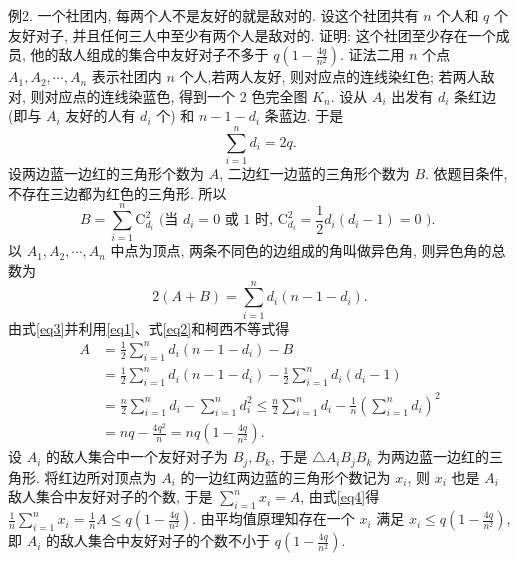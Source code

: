例2. 一个社团内, 每两个人不是友好的就是敌对的.
设这个社团共有 $n$ 个人和 $q$ 个友好对子, 并且任何三人中至少有两个人是敌对的.
证明: 这个社团至少存在一个成员, 他的敌人组成的集合中友好对子不多于 $q\left(1-\frac{4 q}{n^2}\right)$. 
证法二用 $n$ 个点 $A_1, A_2, \cdots, A_n$ 表示社团内 $n$ 个人,若两人友好, 则对应点的连线染红色; 若两人敌对, 则对应点的连线染蓝色, 得到一个 2 色完全图 $K_n$. 设从 $A_i$ 出发有 $d_i$ 条红边 (即与 $A_i$ 友好的人有 $d_i$ 个) 和 $n-1-d_i$ 条蓝边.
于是
$$
\sum_{i=1}^n d_i=2 q . \label{eq1}
$$
设两边蓝一边红的三角形个数为 $A$, 二边红一边蓝的三角形个数为 $B$. 依题目条件,不存在三边都为红色的三角形.
所以
$$
B=\sum_{i=1}^n \mathrm{C}_{d_i}^2 \text { (当 } d_i=0 \text { 或 } 1 \text { 时, } \mathrm{C}_{d_i}^2=\frac{1}{2} d_i\left(d_i-1\right)=0 \text { ). } \label{eq2}
$$
以 $A_1, A_2, \cdots, A_n$ 中点为顶点, 两条不同色的边组成的角叫做异色角, 则异色角的总数为
$$
2(A+B)=\sum_{i=1}^n d_i\left(n-1-d_i\right) . \label{eq3}
$$
由式\ref{eq3}并利用\ref{eq1}、式\ref{eq2}和柯西不等式得
$$
\begin{aligned}
A & =\frac{1}{2} \sum_{i=1}^n d_i\left(n-1-d_i\right)-B \\
& =\frac{1}{2} \sum_{i=1}^n d_i\left(n-1-d_i\right)-\frac{1}{2} \sum_{i=1}^n d_i\left(d_i-1\right) \\
& =\frac{n}{2} \sum_{i=1}^n d_i-\sum_{i=1}^n d_i^2 \leqslant \frac{n}{2} \sum_{i=1}^n d_i-\frac{1}{n}\left(\sum_{i=1}^n d_i\right)^2 \\
& =n q-\frac{4 q^2}{n}=n q\left(1-\frac{4 q}{n^2}\right) . \label{eq4}
\end{aligned}
$$
设 $A_i$ 的敌人集合中一个友好对子为 $B_j, B_k$, 于是 $\triangle A_i B_j B_k$ 为两边蓝一边红的三角形.
将红边所对顶点为 $A_i$ 的一边红两边蓝的三角形个数记为 $x_i$, 则 $x_i$ 也是 $A_i$ 敌人集合中友好对子的个数, 于是 $\sum_{i=1}^n x_i=A$, 由式\ref{eq4}得
$\frac{1}{n} \sum_{i=1}^n x_i=\frac{1}{n} A \leqslant q\left(1-\frac{4 q}{n^2}\right)$. 由平均值原理知存在一个 $x_i$ 满足 $x_i \leqslant q\left(1-\frac{4 q}{n^2}\right)$, 即 $A_i$ 的敌人集合中友好对子的个数不小于 $q\left(1-\frac{4 q}{n^2}\right)$.



